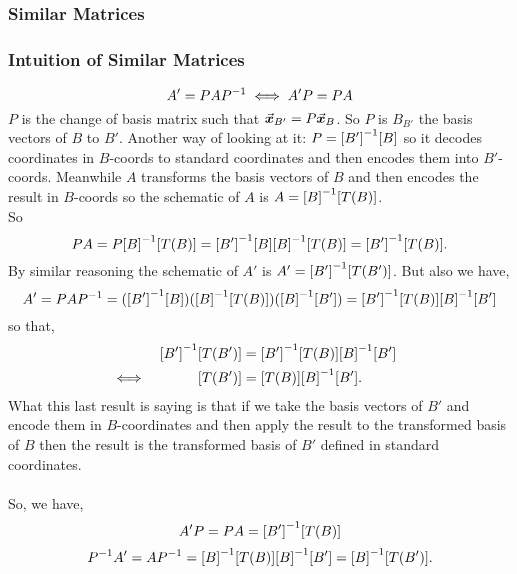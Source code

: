 \documentclass[../MathsNotesBase.tex]{subfiles}
\begin{document}
{		\subsubsection{Similar Matrices}\label{sssection:similar-matrices}
		\bigskip
		\medskip
		
		\medskip
		\subsubsection{Intuition of Similar Matrices}
		\[ A' = PA{P}^{-1} \iff A'P = PA \]
		$P$ is the change of basis matrix such that ${ \vec{\bm{x}}_{B'} = P\vec{\bm{x}}_B }$. So $P$ is $B_{B'}$ the basis vectors of $B$ \wrt to $B'$. Another way of looking at it: ${ P = {[B']}^{-1}[B] }$ so it decodes coordinates in $B$-coords to standard coordinates and then encodes them into $B'$-coords. Meanwhile $A$ transforms the basis vectors of $B$ and then encodes the result in $B$-coords so the schematic of $A$ is ${ A = {[B]}^{-1}[T(B)] }$.\\
		So 
		\[ PA = P{[B]}^{-1}[T(B)] = {[B']}^{-1}[B]{[B]}^{-1}[T(B)] = {[B']}^{-1}[T(B)]. \]
		By similar reasoning the schematic of $A'$ is ${ A' = {[B']}^{-1}[T(B')] }$. But also we have,
		\[ A' = PA{P}^{-1} = ({[B']}^{-1}[B])({[B]}^{-1}[T(B)])({[B]}^{-1}[B']) = {[B']}^{-1}[T(B)]{[B]}^{-1}[B'] \]
		so that,
		\begin{align*}
		&& {[B']}^{-1}[T(B')] &= {[B']}^{-1}[T(B)]{[B]}^{-1}[B'] \\
		&\iff & [T(B')] &= [T(B)]{[B]}^{-1}[B']. &\text{\scriptsize{}} \\
		\end{align*}
		What this last result is saying is that if we take the basis vectors of $B'$ and encode them in $B$-coordinates and then apply the result to the transformed basis of $B$ then the result is the transformed basis of $B'$ defined in standard coordinates.\\\\
		So, we have,
		\[ A'P = PA = {[B']}^{-1}[T(B)] \]
		\[ {P}^{-1}A' = A{P}^{-1} = {[B]}^{-1}[T(B)]{[B]}^{-1}[B'] = {[B]}^{-1}[T(B')]. \]
		
}
\end{document}
